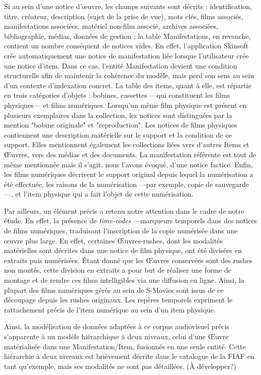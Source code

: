 Si au sein d'une notice d'œuvre, les champs suivants sont décrits : identification, titre, créateur, description (sujet de la prise de vue), mots clés, films associés, manifestations associées, matériel non-film associé, archives associées, bibliographie, médias, données de gestion ; la table Manifestations, en revanche, contient un nombre conséquent de notices vides. En effet, l'application Skinsoft crée automatiquement une notice de manifestation liée lorsque l'utilisateur crée une notice d'item. Dans ce cas, l’entité Manifestation devient une condition structurelle afin de maintenir la cohérence du modèle, mais perd son sens au sein d’un contexte d'indexation concret. La table des items, quant à elle, est répartie en trois catégories d'objets : bobines, cassettes ---qui constituent les films physiques--- et films numériques. Lorsqu'un même film physique est présent en plusieurs exemplaires dans la collection, les notices sont distinguées par la mention "bobine originale" et "reproduction". Les notices de films physiques contiennent une description matérielle sur le support et la condition de ce support. Elles mentionnent également les collections liées vers d'autres Items et Œuvres, vers des médias et des documents. La manifestation référente est tout de même mentionnée mais il s'agit, nous l'avons évoqué, d'une notice factice. Enfin, les films numériques décrivent le support original depuis lequel la numérisation a été effectuée, les raisons de la numérisation ---par exemple, copie de sauvegarde---, et l'item physique qui a fait l'objet de cette numérisation.  

Par ailleurs, un élément précis a retenu notre attention dans le cadre de notre étude. En effet, la présence de \textit{time-codes} ---marqueurs temporels dans des notices de films numériques, traduisant l'inscription de la copie numérisée dans une œuvre plus large. En effet, certaines Œuvres-rushes, dont les modalités matérielles sont décrites dans une notice de film physique, ont été divisées en extraits puis numérisées. Étant donné que les Œuvres conservées sont des rushes non montés, cette division en extraits a pour but de réaliser une forme de montage et de rendre ces films intelligibles via une diffusion en ligne. Ainsi, la plupart des films numériques gérés au sein de S-Movies sont issus de ce découpage depuis les rushes originaux. Les repères temporels expriment le rattachement précis de l'item numérique au sein d'un item physique.  

Ainsi, la modélisation de données adaptées à ce corpus audiovisuel précis s'apparente à un modèle hiérarchique à deux niveaux, celui d'une Œuvre matérialisée dans une Manifestation/Item, fusionnés en une seule entité. Cette hiérarchie à deux niveaux est brièvement décrite dans le catalogue de la FIAF en tant qu'exemple, mais ses modalités ne sont pas détaillées. (À développer?) 

